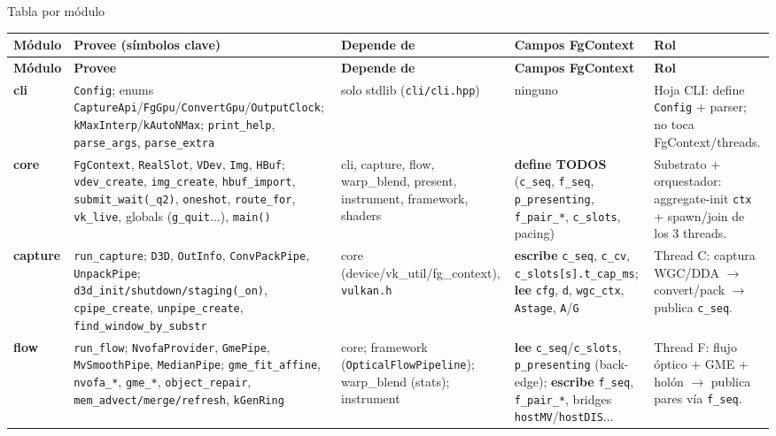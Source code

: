 \documentclass[aspectratio=169]{beamer}
\newcommand{\Lcli}[1]{\textcolor{cliCol}{\textbf{#1}}}
\newcommand{\Lcore}[1]{\textcolor{coreCol}{\textbf{#1}}}
\newcommand{\Lcap}[1]{\textcolor{capCol}{\textbf{#1}}}
\newcommand{\Lflow}[1]{\textcolor{flowCol}{\textbf{#1}}}
\begin{document}
\begin{frame}[allowframebreaks]{Tabla por m\'odulo}
\scriptsize
\setlength{\tabcolsep}{3pt}
\renewcommand{\arraystretch}{1.12}
\begin{longtable}{p{1.35cm} p{2.85cm} p{2.35cm} p{2.65cm} p{2.55cm}}
\toprule
\textbf{M\'odulo} & \textbf{Provee (s\'imbolos clave)} & \textbf{Depende de} & \textbf{Campos FgContext} & \textbf{Rol} \\
\midrule
\endfirsthead
\toprule
\textbf{M\'odulo} & \textbf{Provee} & \textbf{Depende de} & \textbf{Campos FgContext} & \textbf{Rol} \\
\midrule
\endhead
\bottomrule
\endfoot

\Lcli{cli} &
\texttt{Config}; enums \texttt{CaptureApi}/\texttt{FgGpu}/\texttt{ConvertGpu}/\texttt{OutputClock}; \texttt{kMaxInterp}/\texttt{kAutoNMax}; \texttt{print\_help}, \texttt{parse\_args}, \texttt{parse\_extra} &
solo stdlib (\texttt{cli/cli.hpp}) &
ninguno &
Hoja CLI: define \texttt{Config} + parser; no toca FgContext/threads. \\

\Lcore{core} &
\texttt{FgContext}, \texttt{RealSlot}, \texttt{VDev}, \texttt{Img}, \texttt{HBuf}; \texttt{vdev\_create}, \texttt{img\_create}, \texttt{hbuf\_import}, \texttt{submit\_wait(\_q2)}, \texttt{oneshot}, \texttt{route\_for}, \texttt{vk\_live}, globals (\texttt{g\_quit}...), \texttt{main()} &
cli, capture, flow, warp\_blend, present, instrument, framework, shaders &
\textbf{define TODOS} (\texttt{c\_seq}, \texttt{f\_seq}, \texttt{p\_presenting}, \texttt{f\_pair\_*}, \texttt{c\_slots}, pacing) &
Substrato + orquestador: aggregate-init \texttt{ctx} + spawn/join de los 3 threads. \\

\Lcap{capture} &
\texttt{run\_capture}; \texttt{D3D}, \texttt{OutInfo}, \texttt{ConvPackPipe}, \texttt{UnpackPipe}; \texttt{d3d\_init/shutdown/staging(\_on)}, \texttt{cpipe\_create}, \texttt{unpipe\_create}, \texttt{find\_window\_by\_substr} &
core (device/vk\_util/fg\_context), \texttt{vulkan.h} &
\textbf{escribe} \texttt{c\_seq}, \texttt{c\_cv}, \texttt{c\_slots[s].t\_cap\_ms}; \textbf{lee} \texttt{cfg}, \texttt{d}, \texttt{wgc\_ctx}, \texttt{Astage}, \texttt{A}/\texttt{G} &
Thread C: captura WGC/DDA $\to$ convert/pack $\to$ publica \texttt{c\_seq}. \\

\Lflow{flow} &
\texttt{run\_flow}; \texttt{NvofaProvider}, \texttt{GmePipe}, \texttt{MvSmoothPipe}, \texttt{MedianPipe}; \texttt{gme\_fit\_affine}, \texttt{nvofa\_*}, \texttt{gme\_*}, \texttt{object\_repair}, \texttt{mem\_advect/merge/refresh}, \texttt{kGenRing} &
core; framework (\texttt{OpticalFlowPipeline}); warp\_blend (stats); instrument &
\textbf{lee} \texttt{c\_seq}/\texttt{c\_slots}, \texttt{p\_presenting} (back-edge); \textbf{escribe} \texttt{f\_seq}, \texttt{f\_pair\_*}, bridges \texttt{hostMV}/\texttt{hostDIS}... &
Thread F: flujo \'optico + GME + hol\'on $\to$ publica pares v\'ia \texttt{f\_seq}. \\


\end{longtable}
\end{frame}
\end{document}
